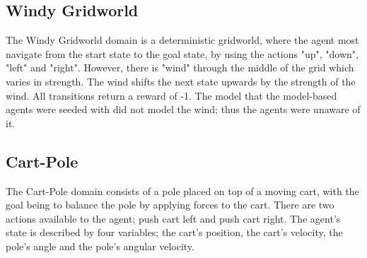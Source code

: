 


\subsection{Windy Gridworld}
\label{sec:windy}
The Windy Gridworld domain \cite{Sutton1998} is a deterministic gridworld, where the agent most navigate from the start state to the goal state, by using the actions "up", "down", "left" and "right". However, there is "wind" through the middle of the grid which varies in strength. The wind shifts the next state upwards by the strength of the wind. All transitions return a reward of -1. The model that the model-based agents were seeded with did not model the wind; thus the agents were unaware of it.



\subsection{Cart-Pole}
The Cart-Pole domain \cite{1606.01540, 6313077} consists of a pole placed on top of a moving cart, with the goal being to balance the pole by applying forces to the cart. There are two actions available to the agent; push cart left and push cart right. The agent's state is described by four variables; the cart's position, the cart's velocity, the pole's angle and the pole's angular velocity. 



